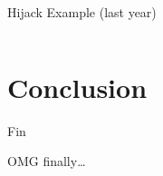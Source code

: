 \documentclass[beamer]{uibk}
\begin{document}
\begin{frame}[t,fragile]{Hijack Example (last year)}
    \begin{columns}
        \begin{column}{0.75\textwidth}
        \end{column}
        \begin{column}{0.25\textwidth}
        \end{column}
    \end{columns}
\end{frame}

\section*{Conclusion}

\begin{frame}{Fin}
   \begin{center}
       \huge OMG finally\dots
   \end{center}
\end{frame}
\end{document}
